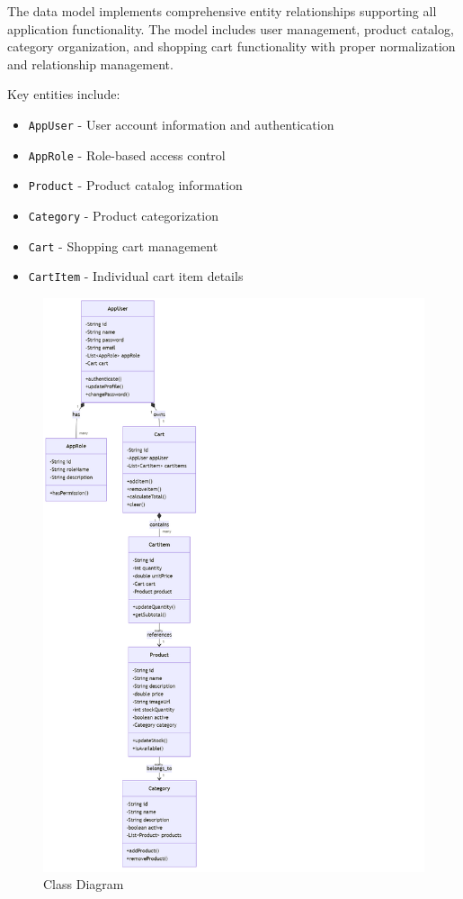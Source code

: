 \documentclass[12pt,a4paper]{article}
\begin{document}
The data model implements comprehensive entity relationships supporting all application functionality. The model includes user management, product catalog, category organization, and shopping cart functionality with proper normalization and relationship management.

Key entities include:
\begin{itemize}
    \item \texttt{AppUser} - User account information and authentication
    \item \texttt{AppRole} - Role-based access control
    \item \texttt{Product} - Product catalog information
    \item \texttt{Category} - Product categorization
    \item \texttt{Cart} - Shopping cart management
    \item \texttt{CartItem} - Individual cart item details
\end{itemize}

\begin{figure}[H]
    \centering
    \includegraphics[width=1.0\textwidth]{class.png}
    \caption{Class Diagram}
\end{figure}
\end{document}
